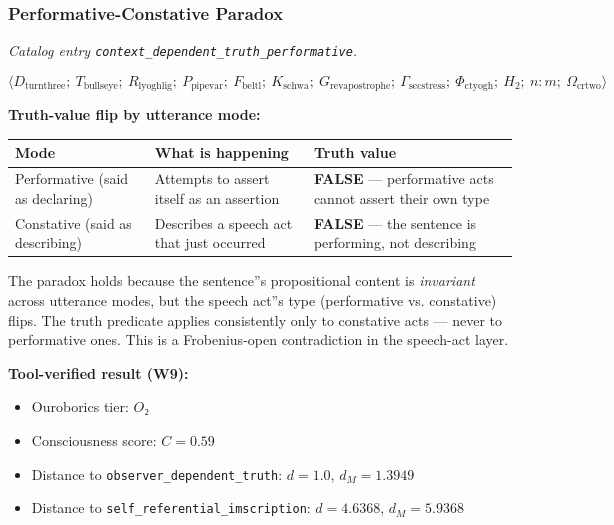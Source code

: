 \documentclass[12pt,a4paper]{article}
\begin{document}
\subsubsection{Performative-Constative Paradox}

\emph{Catalog entry \texttt{context\_dependent\_truth\_performative}.}

\[\langle D_{\text{turnthree}};\ T_{\text{bullseye}};\ R_{\text{lyoghlig}};\ P_{\text{pipevar}};\ F_{\text{beltl}};\ K_{\text{schwa}};\ G_{\text{revapostrophe}};\ \Gamma_{\text{secstress}};\ \Phi_{\text{ctyogh}};\ H_2;\ n{:}m;\ \Omega_{\text{crtwo}} \rangle\]

\textbf{Truth-value flip by utterance mode:}

\begin{table}[htbp]
\centering
\small
{}
\begin{tabularx}{\textwidth}{>{\centering\arraybackslash}X >{\centering\arraybackslash}X >{\centering\arraybackslash}X}
\toprule
\rowcolor{gray!25}\textbf{Mode} & \textbf{What is happening} & \textbf{Truth value} \\
\midrule
\rowcolors{1}{white}{gray!10}
Performative (said as declaring) & Attempts to assert itself as an assertion & \textbf{FALSE} --- performative acts cannot assert their own type \\
Constative (said as describing) & Describes a speech act that just occurred & \textbf{FALSE} --- the sentence is performing, not describing \\
\bottomrule
\end{tabularx}
\end{table}

The paradox holds because the sentence''s propositional content is \emph{invariant} across utterance modes, but the speech act''s type (performative vs. constative) flips. The truth predicate applies consistently only to constative acts --- never to performative ones. This is a Frobenius-open contradiction in the speech-act layer.

\textbf{Tool-verified result (W9):}

\begin{itemize}
    \item Ouroborics tier: $O₂$
    \item Consciousness score: $C = 0.59$
    \item Distance to \texttt{observer\_dependent\_truth}: $d = 1.0$, $d_M = 1.3949$
    \item Distance to \texttt{self\_referential\_imscription}: $d = 4.6368$, $d_M = 5.9368$
\end{itemize}
\end{document}
